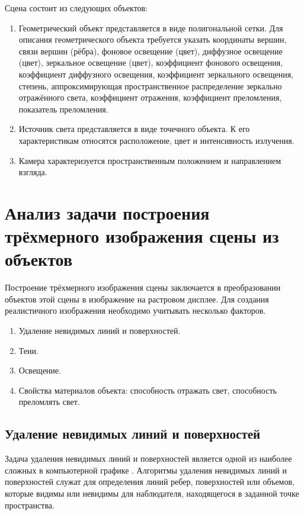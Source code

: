 Сцена состоит из следующих объектов:
\begin{enumerate}[label=\arabic*)]
	\item Геометрический объект представляется в виде полигональной сетки. Для описания геометрического объекта требуется указать координаты вершин, связи вершин (рёбра), фоновое освещение (цвет), диффузное освещение (цвет), зеркальное освещение (цвет), коэффициент фонового освещения, коэффициент диффузного освещения, коэффициент зеркального освещения, степень, аппроксимирующая пространственное распределение зеркально отражённого света, коэффициент отражения, коэффициент преломления, показатель преломления.
	\item Источник света представляется в виде точечного объекта. К его характеристикам относятся расположение, цвет и интенсивность излучения.
	\item Камера характеризуется пространственным положением и направлением взгляда.
\end{enumerate}

\section{Анализ задачи построения трёхмерного изображения сцены из объектов}

Построение трёхмерного изображения сцены заключается в преобразовании объектов этой сцены
в изображение на растровом дисплее. Для создания реалистичного изображения необходимо учитывать несколько факторов.
\begin{enumerate}[label=\arabic*)]
	\item Удаление невидимых линий и поверхностей.
	\item Тени.
	\item Освещение.
	\item Свойства материалов объекта: способность отражать свет, способность преломлять свет.
\end{enumerate}

\subsection{Удаление невидимых линий и поверхностей}\label{choiceraytracing}

Задача удаления невидимых линий и поверхностей является одной из наиболее сложных в компьютерной графике \cite{rodgers}.
Алгоритмы удаления невидимых линий и поверхностей служат для определения линий ребер, поверхностей или объемов, которые видимы или невидимы для наблюдателя, находящегося в заданной точке пространства.

